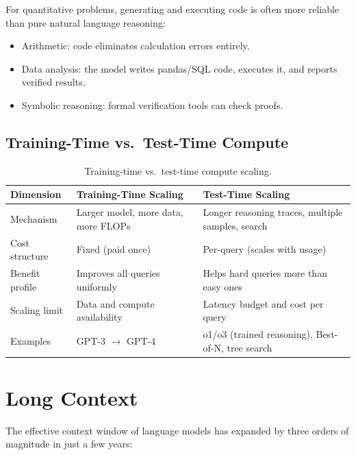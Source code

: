 For quantitative problems, generating and executing code is often more
reliable than pure natural language reasoning:
\begin{itemize}[leftmargin=*]
\item Arithmetic: code eliminates calculation errors entirely.
\item Data analysis: the model writes pandas/SQL code, executes it, and
  reports verified results.
\item Symbolic reasoning: formal verification tools can check proofs.
\end{itemize}

\subsection{Training-Time vs.\ Test-Time Compute}

\begin{table}[H]
\centering
\small
\begin{tabularx}{\textwidth}{@{}l X X@{}}
\toprule
\textbf{Dimension} & \textbf{Training-Time Scaling}
& \textbf{Test-Time Scaling} \\
\midrule
Mechanism & Larger model, more data, more FLOPs
  & Longer reasoning traces, multiple samples, search \\
Cost structure & Fixed (paid once) & Per-query (scales with usage) \\
Benefit profile & Improves all queries uniformly
  & Helps hard queries more than easy ones \\
Scaling limit & Data and compute availability
  & Latency budget and cost per query \\
Examples & GPT-3 $\to$ GPT-4 & o1/o3 (trained reasoning), Best-of-N,
  tree search \\
\bottomrule
\end{tabularx}
\caption{Training-time vs.\ test-time compute scaling.}
\label{tab:train_test_compute}
\end{table}


\section{Long Context}
\label{sec:long_context}

The effective context window of language models has expanded by three orders
of magnitude in just a few years:

